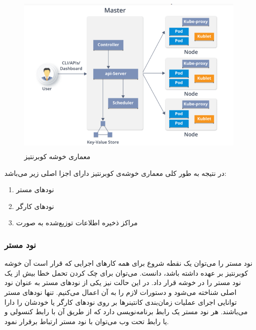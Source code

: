 \begin{figure}[!h]
	\centering
	\includegraphics[height=8cm]{images/kubernetes-cluster}
	\caption{معماری خوشه کوبرنتیز}
	\label{تصویر 2-10}
\end{figure}

در نتیجه به طور کلی معماری خوشه‌ی کوبرنتیز دارای اجزا اصلی زیر می‌باشد:

\begin{enumerate}
	\item نودهای مستر
	\item	 نود‌های کارگر
	\item مراکز ذخیره اطلاعات توزیع‌شده به صورت 
\end{enumerate}


\subsubsection*{نود مستر}
نود مستر را می‌توان یک نقطه شروع برای همه کارهای اجرایی که قرار است آن خوشه کوبرنتیز بر عهده داشته باشد، دانست. می‌توان برای چک کردن تحمل خطا بیش از یک نود مستر را در خوشه قرار داد. در این حالت نیز یکی از نودهای مستر به عنوان نود اصلی شناخته می‌شود و دستورات لازم را به آن اعمال می‌کنیم. تنها نود‌های مستر توانایی اجرای عملیات زمان‌بندی کانتینرها بر روی نود‌های کارگر یا خودشان را دارا می‌باشند. هر نود مستر یک رابط برنامه‌نویسی دارد که از طریق آن با رابط کنسولی و یا رابط تحت وب می‌توان با نود مستر ارتباط برقرار نمود.

